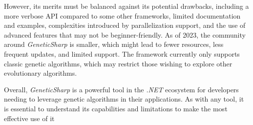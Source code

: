   However, its merits must be balanced against its potential drawbacks, 
  including a more verbose API compared to some other frameworks, limited 
  documentation and examples, complexities introduced by parallelization 
  support, and the use of advanced features that may not be beginner-friendly.
  As of 2023, the community around \textit{GeneticSharp} is smaller, which 
  might lead to fewer resources, less frequent updates, and limited support.
  The framework currently only supports classic genetic algorithms, which may 
  restrict those wishing to explore other evolutionary algorithms.

  Overall, \textit{GeneticSharp} is a powerful tool in the \textit{.NET} 
  ecosystem for developers needing to leverage genetic algorithms in their 
  applications.
  As with any tool, it is essential to understand its capabilities and 
  limitations to make the most effective use of it

